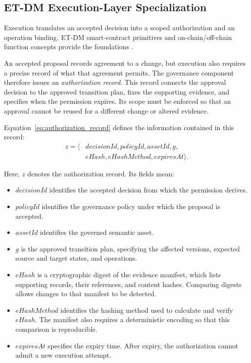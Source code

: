 \documentclass[journal]{IEEEtran}
\begin{document}
\subsection{ET-DM Execution-Layer Specialization}
\label{sec:smart_contracts}

Execution translates an accepted decision into a scoped
authorization and an operation binding. ET-DM smart-contract
primitives and on-chain/off-chain function concepts provide
the foundations
\cite{Avanzo2025Thesis}.

An accepted proposal records agreement to a change, but execution
also requires a precise record of what that agreement permits.
The governance component therefore issues an \emph{authorization
record}. This record connects the approval decision to the approved
transition plan, fixes the supporting evidence, and specifies when
the permission expires. Its scope must be enforced so that an
approval cannot be reused for a different change or altered evidence.

Equation~\ref{eq:authorization_record} defines the information
contained in this record:
\begin{equation}
\label{eq:authorization_record}
\begin{aligned}
z=\langle&
decisionId,policyId,assetId,g,\\
&eHash,eHashMethod,expiresAt\rangle.
\end{aligned}
\end{equation}

Here, $z$ denotes the authorization record. Its fields mean:
\begin{itemize}
    \item $decisionId$ identifies the accepted decision from which
    the permission derives.
    \item $policyId$ identifies the governance policy under which
    the proposal is accepted.
    \item $assetId$ identifies the governed semantic asset.
    \item $g$ is the approved transition plan, specifying the affected
    versions, expected source and target states, and operations.
    \item $eHash$ is a cryptographic digest of the evidence manifest,
    which lists supporting records, their references, and content hashes.
    Comparing digests allows changes to that manifest to be detected.
    \item $eHashMethod$ identifies the hashing method used to calculate
    and verify $eHash$. The manifest also requires a deterministic
    encoding so that this comparison is reproducible.
    \item $expiresAt$ specifies the expiry time. After expiry, the
    authorization cannot admit a new execution attempt.
\end{itemize}
\end{document}
